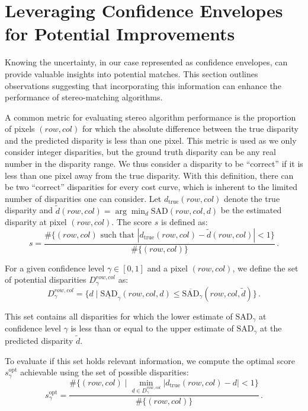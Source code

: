 \section{Leveraging Confidence Envelopes for Potential Improvements}

Knowing the uncertainty, in our case represented as confidence envelopes, can provide valuable insights into potential matches. This section outlines observations suggesting that incorporating this information can enhance the performance of stereo-matching algorithms.

A common metric for evaluating stereo algorithm performance is the proportion of pixels $(row, col)$ for which the absolute difference between the true disparity and the predicted disparity is less than one pixel. This metric is used as we only consider integer disparities, but the ground truth disparity can be any real number in the disparity range. We thus consider a disparity to be ``correct'' if it is less than one pixel away from the true disparity. With this definition, there can be two ``correct'' disparities for every cost curve, which is inherent to the limited number of disparities one can consider. Let $d_{\mathrm{true}}(row, col)$ denote the true disparity and $\tilde{d}(row, col) = \arg \min_d \mathrm{SAD}(row, col, d)$ be the estimated disparity at pixel $(row, col)$. The score \( s \) is defined as:
\begin{equation}
    s = \frac{\#\{(row, col) \text{ such that } |d_{\mathrm{true}}(row, col) - \tilde{d}(row, col)| < 1\}}{\#\{(row, col)\}}\,.
\end{equation}

For a given confidence level $\gamma \in [0, 1]$ and a pixel $(row, col)$, we define the set of potential disparities $D_\gamma^{row, col}$ as:
\begin{equation}
    D_\gamma^{row, col} = \{d \mid \underline{\mathrm{SAD}}_\gamma(row, col, d) \leq \overline{\mathrm{SAD}}_\gamma(row, col, \tilde{d})\}\,.
\end{equation}

This set contains all disparities for which the lower estimate of $\mathrm{SAD}_\gamma$ at confidence level $\gamma$ is less than or equal to the upper estimate of $\mathrm{SAD}_\gamma$ at the predicted disparity $\tilde{d}$.

To evaluate if this set holds relevant information, we compute the optimal score \( s_\gamma^{\text{opt}} \) achievable using the set of possible disparities:
\begin{equation}
    s_\gamma^{\text{opt}} = \frac{\#\{(row, col) \mid \min_{d \in D_\gamma^{row, col}} |d_{\mathrm{true}}(row, col) - d| < 1\}}{\#\{(row, col)\}}\,.
\end{equation}


